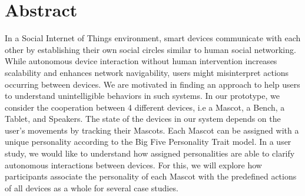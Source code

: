 ﻿\section*{Abstract}
In a Social Internet of Things environment, smart devices communicate with each other
by establishing their own social circles similar to human social networking.
While autonomous device interaction without human intervention increases scalability
and enhances network navigability, users might misinterpret actions occurring between devices.
We are motivated in finding an approach to help users to understand unintelligible behaviors in such systems.
In our prototype, we consider the cooperation between 4 different devices,
i.e a Mascot, a Bench, a Tablet, and Speakers.
The state of the devices in our system depends on the user’s movements by tracking their Mascots.
Each Mascot can be assigned with a unique personality according to the Big Five Personality Trait model.
In a user study, we would like to understand how assigned personalities
are able to clarify autonomous interactions between devices.
For this, we will explore how participants associate the personality of
each Mascot with the predefined actions of all devices as a whole for several case studies.